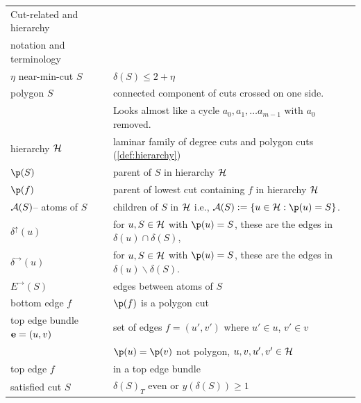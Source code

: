 {\noindent
 \begin{tabular}{|l |l |} 
 \hline
Cut-related and hierarchy  &  \\ 
notation and terminology & \\
 \hline\hline
 $\eta$ near-min-cut $S$ & $\delta(S) \le 2 + \eta$\\
polygon $S$ & connected component of cuts crossed on one side. \\
&Looks almost like a cycle $a_0, a_1, \ldots a_{m-1}$ with $a_0$ removed.\\
hierarchy $\mathcal{H}$ & laminar family of degree cuts and polygon cuts (\cref{def:hierarchy})  \\
$\p(S)$ & parent of $S$ in hierarchy $\mathcal{H}$\\
$\p(f)$ &  parent of lowest cut containing $f$ in hierarchy $\mathcal{H}$\\
${\cal A}(S)$-- atoms of $S$ & children of $S$ in $\mathcal{H}$ i.e., $\cA(S):=\{u\in \cH: \p(u)=S\}$.\\ 
$\delta^\uparrow(u)$  & for $u,S \in \mathcal{H}$ with $\p(u) = S$, these are the edges in $\delta(u)\cap\delta(S)$,\\
$\delta^\rightarrow(u)$  & for $u,S \in \mathcal{H}$ with $\p(u) = S$, these are the edges in $\delta(u) \smallsetminus\delta(S)$.\\
$E^\rightarrow (S)$ & edges between atoms of $S$\\
bottom edge $f$ & $\p(f)$ is a polygon cut \\
top edge bundle ${\bf e}= (u,v)$ &  set of edges $f= (u',v')$ where $u' \in u $, 
$v' \in v$\\
& \quad \quad $\p(u) = \p(v)$ not polygon, $u,v,u',v' \in \mathcal{H}$\\
top edge $f$ & in a top edge bundle  \\
satisfied cut $S$ & $\delta(S)_T$ even or $y(\delta(S))\ge 1$\\
 \hline
\end{tabular}

}
